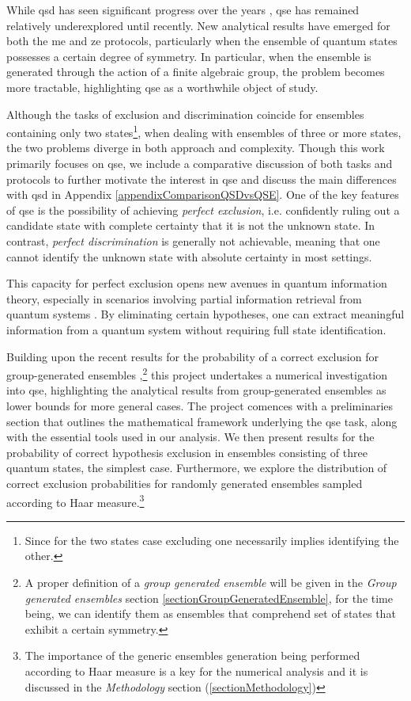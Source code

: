 \documentclass[12pt,letterpaper]{article}
\begin{document}
While \gls{qsd} has seen significant progress over the years \cite{bae2015quantum, helstromBook}, \gls{qse} has remained relatively underexplored until recently. New analytical results have emerged \cite{MainPaper} for both the \gls{me} and \gls{ze} protocols, particularly when the ensemble of quantum states possesses a certain degree of symmetry. In particular, when the ensemble is generated through the action of a finite algebraic group, the problem becomes more tractable, highlighting \gls{qse} as a worthwhile object of study.

Although the tasks of exclusion and discrimination coincide for ensembles containing only two states\footnote{Since for the two states case excluding one necessarily implies identifying the other.}, when dealing with ensembles of three or more states, the two problems diverge in both approach and complexity. Though this work primarily focuses on \gls{qse}, we include a comparative discussion of both tasks and protocols to further motivate the interest in \gls{qse} and discuss the main differences with \gls{qsd} in Appendix \ref{appendixComparisonQSDvsQSE}. One of the key features of \gls{qse} is the possibility of achieving \emph{perfect exclusion}, i.e. confidently ruling out a candidate state with complete certainty that it is not the unknown state. In contrast, \emph{perfect discrimination} is generally not achievable, meaning that one cannot identify the unknown state with absolute certainty in most settings\cite{OptimalitySRM}.

This capacity for perfect exclusion opens new avenues in quantum information theory, especially in scenarios involving partial information retrieval from quantum systems \cite{gour2020weight}. By eliminating certain hypotheses, one can extract meaningful information from a quantum system without requiring full state identification.

Building upon the recent results for the probability of a correct exclusion for group-generated ensembles \cite{MainPaper},\footnote{A proper definition of a \emph{group generated ensemble} will be given in the \emph{Group generated ensembles} section \ref{sectionGroupGeneratedEnsemble}, for the time being, we can identify them as ensembles that comprehend set of states that exhibit a certain symmetry.} this project undertakes a numerical investigation into \gls{qse}, highlighting the analytical results from group-generated ensembles as lower bounds for more general cases. The project comences with a preliminaries section that outlines the mathematical framework underlying the \gls{qse} task, along with the essential tools used in our analysis. We then present results for the probability of correct hypothesis exclusion in ensembles consisting of three quantum states, the simplest case. Furthermore, we explore the distribution of correct exclusion probabilities for randomly generated ensembles sampled according to Haar measure.\footnote{The importance of the generic ensembles generation being performed according to Haar measure is a key for the numerical analysis and it is discussed in the \emph{Methodology} section (\ref{sectionMethodology})}
\end{document}
